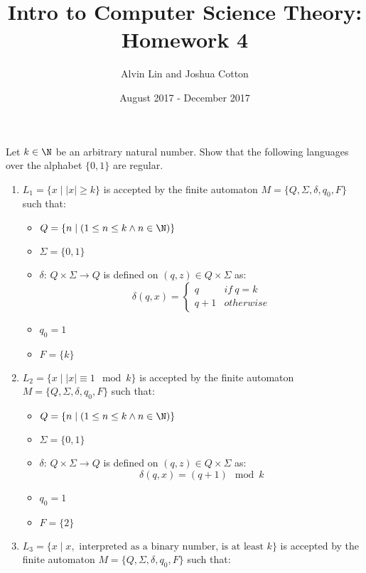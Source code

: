 \documentclass[letterpaper, 12pt]{math}
\title{Intro to Computer Science Theory: Homework 4}
\author{Alvin Lin and Joshua Cotton}
\date{August 2017 - December 2017}
\begin{document}
\maketitle

Let \( k\in\N \) be an arbitrary natural number. Show that the following
languages over the alphabet \( \{0,1\} \) are regular.
\begin{enumerate}
  \item \( L_1 = \{x\mid|x|\ge k\} \) is accepted by the finite automaton
  \( M = \{Q,\Sigma,\delta,q_0,F\} \) such that:
  \begin{itemize}
    \item \( Q = \{n\mid(1\le n\le k \wedge n\in\N)\} \)
    \item \( \Sigma = \{0,1\} \)
    \item \( \delta \): \( Q\times\Sigma\to Q \) is defined on \( (q,z)\in
    Q\times\Sigma \) as:
    \[ \delta(q,x) = \begin{cases}
      q & if\ q = k \\
      q+1 & otherwise
    \end{cases} \]
    \item \( q_0 = 1 \)
    \item \( F = \{k\} \)
  \end{itemize}
  \item \( L_2 = \{x\mid|x|\equiv1\mod k\} \) is accepted by the finite
  automaton \( M = \{Q,\Sigma,\delta,q_0,F\} \) such that:
  \begin{itemize}
    \item \( Q = \{n\mid(1\le n\le k \wedge n\in\N)\} \)
    \item \( \Sigma = \{0,1\} \)
    \item \( \delta \): \( Q\times\Sigma\to Q \) is defined on \( (q,z)\in
    Q\times\Sigma \) as:
    \[ \delta(q,x) = (q+1)\mod k \]
    \item \( q_0 = 1 \)
    \item \( F = \{2\} \)
  \end{itemize}
  \item \( L_3 = \{x\mid x,\text{ interpreted as a binary number, is at least
  } k\} \) is accepted by the finite automaton \( M = \{Q,\Sigma,\delta,q_0,F\}
  \) such that:
\end{enumerate}
\end{document}
